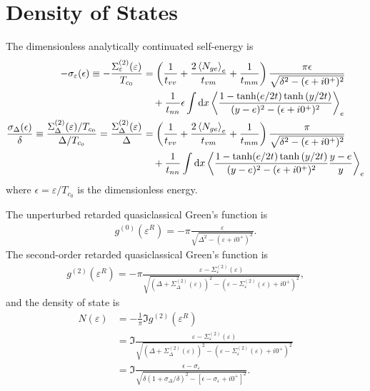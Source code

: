 \documentclass[aps,prl,preprint]{revtex4-2}
\begin{document}
\section{Density of States}

The dimensionless analytically continuated self-energy is
\begin{align}
    - \sigma_\varepsilon(\epsilon) \equiv -\frac{\Sigma^{(2)}_\varepsilon(\varepsilon)}{T_{c_0}}
     & = \left(\frac{1}{t_{vv}} + \frac{2\ev{N_{ge}}_e}{t_{vm}} + \frac{1}{t_{mm}}\right)\frac{\pi\epsilon}{\sqrt{\delta^2 - (\epsilon+i0^+)^2}} \nonumber \\
     & \quad + \frac{1}{t_{nn}}\epsilon\int\dd x\ev{\frac{1-\tanh(e/2t)\tanh{(y/2t)}}{(y-e)^2 - (\epsilon+i0^+)^2}}_e \nonumber                            \\
     \frac{\sigma_\Delta(\epsilon)}{\delta} \equiv \frac{\Sigma^{(2)}_\Delta(\varepsilon)/T_{c_0}}{\Delta/T_{c_0}}
     = \frac{\Sigma^{(2)}_\Delta(\varepsilon)}{\Delta}
     & = \left(\frac{1}{t_{vv}} + \frac{2\ev{N_{ge}}_e}{t_{vm}} + \frac{1}{t_{mm}}\right)\frac{\pi}{\sqrt{\delta^2 - (\epsilon+i0^+)^2}} \nonumber   \\
     & \quad + \frac{1}{t_{nn}}\int\dd x\ev{\frac{1-\tanh(e/2t)\tanh{(y/2t)}}{(y-e)^2 - (\epsilon+i0^+)^2}\frac{y-e}{y}}_e \nonumber                 \\
\end{align}
where $\epsilon = \varepsilon / T_{c_0}$ is the dimensionless energy.

The unperturbed retarded quasiclassical Green's function is
\begin{align}
    g^{(0)}(\varepsilon^R)
    = -\pi\frac{\varepsilon}
    {\sqrt{\Delta^2 - (\varepsilon+i0^+)^2}}.
\end{align}
The second-order retarded quasiclassical Green's function is
\begin{align}
    g^{(2)}(\varepsilon^R)
    = -\pi\frac{\varepsilon - \Sigma^{(2)}_\varepsilon(\varepsilon)}
    {\sqrt{(\Delta + \Sigma^{(2)}_\Delta(\varepsilon))^2
            - (\varepsilon - \Sigma^{(2)}_\varepsilon(\varepsilon) + i0^+)^2}},
\end{align}
and the density of state is
\begin{align}
    N(\varepsilon)
     & = -\frac{1}{\pi}\Im{g^{(2)}(\varepsilon^R)}                                                                                                                                              \\
     & = \Im{\frac{\varepsilon - \Sigma^{(2)}_\varepsilon(\varepsilon)}{\sqrt{(\Delta + \Sigma^{(2)}_\Delta(\varepsilon))^2 - (\varepsilon - \Sigma^{(2)}_\varepsilon(\varepsilon) + i0^+)^2}}} \\
     & = \Im{\frac{\epsilon-\sigma_\varepsilon}{\sqrt{\delta(1+\sigma_\Delta/\delta)^2 - [\epsilon-\sigma_\varepsilon + i0^+]^2}}}.
\end{align}
\end{document}
